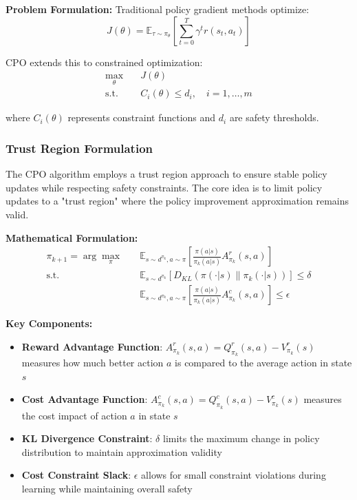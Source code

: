 \documentclass[12pt]{article}
\begin{document}
{{{{\textbf{Problem Formulation:} Traditional policy gradient methods optimize:
\begin{equation}
J(\theta) = \mathbb{E}_{\tau \sim \pi_\theta}\left[\sum_{t=0}^{T} \gamma^t r(s_t, a_t)\right]
\end{equation}

CPO extends this to constrained optimization:
\begin{align}
\max_\theta \quad & J(\theta) \\
\text{s.t.} \quad & C_i(\theta) \leq d_i, \quad i = 1, \ldots, m
\end{align}

where $C_i(\theta)$ represents constraint functions and $d_i$ are safety thresholds.

\subsubsection{Trust Region Formulation}

The CPO algorithm employs a trust region approach to ensure stable policy updates while respecting safety constraints. The core idea is to limit policy updates to a "trust region" where the policy improvement approximation remains valid.

\textbf{Mathematical Formulation:}
\begin{align}
\pi_{k+1} = \arg\max_{\pi} \quad & \mathbb{E}_{s \sim d^{\pi_k}, a \sim \pi}\left[\frac{\pi(a|s)}{\pi_k(a|s)} A^r_{\pi_k}(s,a)\right] \\
\text{s.t.} \quad & \mathbb{E}_{s \sim d^{\pi_k}}\left[D_{KL}(\pi(\cdot|s) \| \pi_k(\cdot|s))\right] \leq \delta \\
& \mathbb{E}_{s \sim d^{\pi_k}, a \sim \pi}\left[\frac{\pi(a|s)}{\pi_k(a|s)} A^c_{\pi_k}(s,a)\right] \leq \epsilon
\end{align}

\textbf{Key Components:}
\begin{itemize}
\item \textbf{Reward Advantage Function}: $A^r_{\pi_k}(s,a) = Q^r_{\pi_k}(s,a) - V^r_{\pi_k}(s)$ measures how much better action $a$ is compared to the average action in state $s$
\item \textbf{Cost Advantage Function}: $A^c_{\pi_k}(s,a) = Q^c_{\pi_k}(s,a) - V^c_{\pi_k}(s)$ measures the cost impact of action $a$ in state $s$
\item \textbf{KL Divergence Constraint}: $\delta$ limits the maximum change in policy distribution to maintain approximation validity
\item \textbf{Cost Constraint Slack}: $\epsilon$ allows for small constraint violations during learning while maintaining overall safety
\end{itemize}

}}}}
\end{document}
